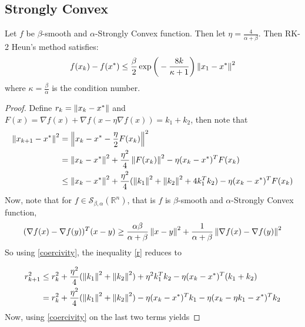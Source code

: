 \subsection{Strongly Convex}
\begin{theorem}
Let $f$ be $\beta$-smooth and $\alpha$-Strongly Convex function. Then let $\eta = \frac{4}{\alpha + \beta}$.
Then RK-2 Heun's method satisfies:
\begin{align*}
f(x_{k}) - f(x^{*}) \leq \frac{\beta}{2} \exp \bigg(- \frac{8 k}{ \kappa + 1} \bigg) \left\lVert x_{1} - x^{*}\right\rVert^{2}
\end{align*}
where $\kappa = \frac{\beta}{\alpha}$ is the condition number.
\end{theorem}
\begin{proof}
Define $r_k = \left\lVert x_{k} - x^{*}\right\rVert$ and $F(x) = \nabla f(x) + \nabla f(x - \eta \nabla f(x)) = k_{1} + k_{2}$, then note that
\begin{align}
\left\lVert x_{k + 1} - x^{*}\right\rVert^{2} &= \left\lVert x_{k} - x^{*} - \frac{\eta}{2}F(x_{k})\right\rVert^{2} \\
&= \left\lVert x_{k} - x^{*}\right\rVert^{2} + \frac{\eta^{2}}{4}\left\lVert F(x_{k})\right\rVert^{2} - \eta (x_{k} - x^{*})^{T} F(x_k) \\ \label{r}
& \leq \left\lVert x_{k} - x^{*}\right\rVert^{2} + \frac{\eta^{2}}{4}(\left\lVert k_{1}\right\rVert^{2} + \left\lVert k_{2}\right\rVert^{2} + 4 k_{1}^{T} k_{2}) - \eta (x_{k} - x^{*})^{T} F(x_k)
\end{align}
Now, note that for $f \in \mathcal{S}_{\beta, \alpha}(\mathbb{R}^{n})$, that is $f$ is $\beta$-smooth and $\alpha$-Strongly Convex function,
\begin{align} \label{coercivity}
(\nabla f(x) - \nabla f(y))^{T}(x - y) \geq \frac{\alpha \beta}{\alpha + \beta}\left\lVert x - y\right\rVert^{2} + \frac{1}{\alpha + \beta}\left\lVert\nabla f(x) - \nabla f(y)\right\rVert^{2}
\end{align}
So using \eqref{coercivity}, the inequality \eqref{r} reduces to

\begin{align}
r_{k + 1}^{2} &\leq r_{k}^{2} + \frac{\eta^{2}}{4}(\left\lVert k_{1}\right\rVert^{2} + \left\lVert k_{2}\right\rVert^{2}) + \eta^{2}k_{1}^{T} k_{2} - \eta (x_{k} - x^{*})^{T} (k_{1} + k_{2}) \\
& = r_{k}^{2} + \frac{\eta^{2}}{4}(\left\lVert k_{1}\right\rVert^{2} + \left\lVert k_{2}\right\rVert^{2}) - \eta (x_{k} - x^{*})^{T} k_1 - \eta (x_{k} - \eta k_{1} - x^{*})^{T} k_2
\end{align}
Now, using \eqref{coercivity} on the last two terms yields


\end{proof}
